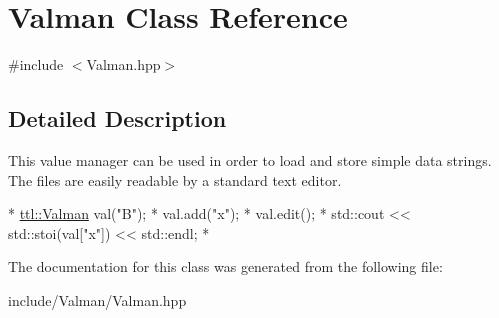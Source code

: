\hypertarget{class_valman}{\section{Valman Class Reference}
\label{class_valman}
}


{\ttfamily \#include $<$Valman.\-hpp$>$}



\subsection{Detailed Description}
This value manager can be used in order to load and store simple data strings. The files are easily readable by a standard text editor.


\begin{DoxyCode}
*  \hyperlink{classttl_1_1_valman}{ttl::Valman} val(\textcolor{stringliteral}{"B"});
*  val.add(\textcolor{stringliteral}{"x"});
*  val.edit();
*  std::cout << std::stoi(val[\textcolor{stringliteral}{"x"}]) << std::endl;
*  
\end{DoxyCode}
 

The documentation for this class was generated from the following file\-:\begin{DoxyCompactItemize}
\item 
include/\-Valman/Valman.\-hpp\end{DoxyCompactItemize}
